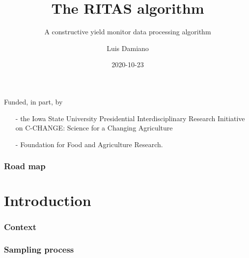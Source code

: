\documentclass{beamer}
\title[The RITAS algorithm]{The RITAS algorithm}
\subtitle{A constructive yield monitor data processing algorithm}
\author[Damiano, Niemi]{Luis Damiano}
\date{2020-10-23}
\institute[ISU]{Department of Statistics\\Iowa State University}
\begin{document}
\begin{frame}
  \maketitle

  {\footnotesize
    Funded, in part, by
    \begin{itemize}
    \item[-] the Iowa State University Presidential Interdisciplinary
      Research Initiative on C-CHANGE: Science for a Changing Agriculture
    \item[-] Foundation for Food and Agriculture Research.
    \end{itemize}
  }
\end{frame}

\begin{frame}
  
  \frametitle{Road map}
  \tableofcontents
  
\end{frame}


\section{Introduction}

\begin{frame}
  \frametitle{Context}

  
\end{frame}

\begin{frame}
  \frametitle{Sampling process}

  
\end{frame}
\end{document}
